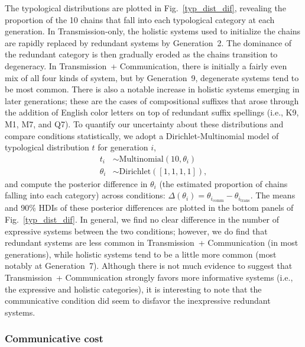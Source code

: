 \documentclass[doc,biblatex]{apa7}
\begin{document}
The typological distributions are plotted in Fig.~\ref{typ_dist_dif}, revealing the proportion of the 10 chains that fall into each typological category at each generation. In Transmission-only, the holistic systems used to initialize the chains are rapidly replaced by redundant systems by Generation~2. The dominance of the redundant category is then gradually eroded as the chains transition to degeneracy. In Transmission~+ Communication, there is initially a fairly even mix of all four kinds of system, but by Generation~9, degenerate systems tend to be most common. There is also a notable increase in holistic systems emerging in later generations; these are the cases of compositional suffixes that arose through the addition of English color letters on top of redundant suffix spellings (i.e., K9, M1, M7, and Q7). To quantify our uncertainty about these distributions and compare conditions statistically, we adopt a Dirichlet-Multinomial model of typological distribution $t$ for generation $i$,
	\begin{equation}
	\begin{aligned}
	   t_i & \sim \mathrm{Multinomial}(10, \theta_i) \\
	   \theta_i & \sim \mathrm{Dirichlet}([1, 1, 1, 1]),
	\end{aligned}
	\end{equation}
and compute the posterior difference in $\theta_i$ (the estimated proportion of chains falling into each category) across conditions: $\Delta(\theta_i) = \theta_{i_\mathrm{comm}} - \theta_{i_\mathrm{trans}}$. The means and 90\% HDIs of these posterior differences are plotted in the bottom panels of Fig.~\ref{typ_dist_dif}. In general, we find no clear difference in the number of expressive systems between the two conditions; however, we do find that redundant systems are less common in Transmission~+ Communication (in most generations), while holistic systems tend to be a little more common (most notably at Generation~7). Although there is not much evidence to suggest that Transmission~+ Communication strongly favors more informative systems (i.e., the expressive and holistic categories), it is interesting to note that the communicative condition did seem to disfavor the inexpressive redundant systems.

\subsubsection{Communicative cost}
\end{document}
